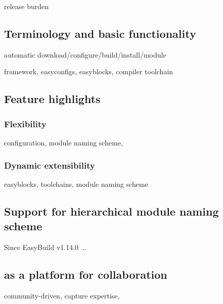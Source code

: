 
\cite{EasyBuildSC12} release burden~\cite{Dubois03}

\subsection{Terminology and basic functionality}

automatic download/configure/build/install/module

framework, easyconfigs, easyblocks, compiler toolchain



\subsection{Feature highlights}

\subsubsection{Flexibility}

configuration, module naming scheme,

\subsubsection{Dynamic extensibility}

easyblocks, toolchains, module naming scheme


\subsection{Support for hierarchical module naming scheme}

Since EasyBuild v1.14.0 ...


\subsection{\easybuild{} as a platform for collaboration}

community-driven, capture expertise,

